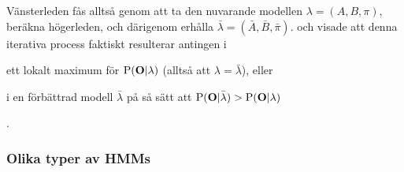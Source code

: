 \documentclass[../rapport_MVEX01-11-05]{subfiles}
\begin{document}
Vänsterleden fås alltså genom att ta den nuvarande modellen $\lambda =
(A,B,\pi)$, beräkna högerleden, och därigenom erhålla $\bar{\lambda} =
(\bar{A},\bar{B}, \bar{\pi})$.  och 
visade att denna iterativa process faktiskt resulterar antingen i
\begin{inparaenum}
	\item ett lokalt maximum för $\mathrm{P}(\mathbf{O}|\lambda)$
  (alltså att $\lambda = \bar{\lambda}$), eller
 	\item i en förbättrad modell $\bar{\lambda}$ på så sätt att
  $\mathrm{P}(\mathbf{O}|\bar{\lambda}) > \mathrm{P}(\mathbf{O}|\lambda)$
\end{inparaenum}. 

%
%

\subsubsection{Olika typer av HMMs}
\end{document}
